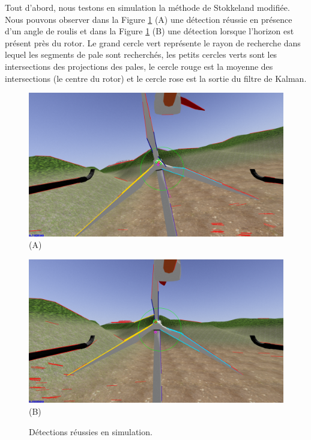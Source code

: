 Tout d'abord, nous testons en simulation la méthode de Stokkeland modifiée. Nous pouvons observer dans la Figure \ref{fig:sim_detection} (A) une détection réussie en présence d'un angle de roulis et dans la Figure \ref{fig:sim_detection} (B) une détection lorsque l'horizon est présent près du rotor. Le grand cercle vert représente le rayon de recherche dans lequel les segments de pale sont recherchés, les petits cercles verts sont les intersections des projections des pales, le cercle rouge est la moyenne des intersections (le centre du rotor) et le cercle rose est la sortie du filtre de Kalman.
\begin{figure}[htbp]
  \centering
  \begin{minipage}{0.49\textwidth}
    \centering
    \includegraphics[width=\linewidth]{images/sim_detection.png} (A)
  \end{minipage}
  \begin{minipage}{0.49\textwidth}
    \centering
    \includegraphics[width=\linewidth]{images/sim_detection3.png} (B)
  \end{minipage}
  \caption{Détections réussies en simulation.}
  \label{fig:sim_detection}
\end{figure}

